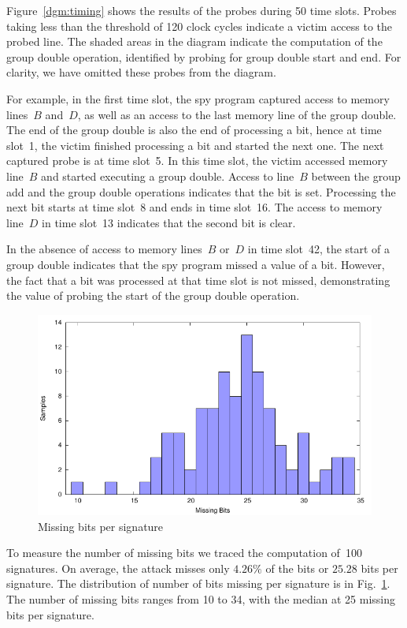 \documentclass[twocolumn]{svjour3}
\begin{document}
Figure~\ref{dgm:timing} shows the results of the probes during 50 time slots.
Probes taking less than the threshold of 120 clock cycles indicate a victim access to the probed line.
The shaded areas in the diagram indicate the computation of the group double operation, identified
by probing for group double start and end.
For clarity, we have omitted these probes from the diagram.


For example, in the first time slot, the spy program captured access to memory lines~$B$ and~$D$, as well as an access
to the last memory line of the group double.
The end of the group double is also the end of processing a bit, hence at time slot~1, the victim finished processing a bit
and started the next one.
The next captured probe is at time slot~5.
In this time slot, the victim accessed memory line~$B$ and started executing a group double.  
Access to line~$B$ between the group add and the group double operations indicates that the bit is set.
Processing the next bit starts at time slot~8 and ends in time slot~16.
The access to memory line~$D$ in time slot~13 indicates that the second bit is clear.

In the absence of access to memory lines~$B$ or~$D$ in time slot~42, the start of a group double indicates
that the spy program missed a value of a bit.
However, the fact that a bit was processed at that time slot is not missed,
demonstrating the value of probing the start of the group double operation.

\begin{figure}[htb]
\includegraphics[width=\columnwidth]{images/missing}
\caption{Missing bits per signature\label{dgm:dist}}
\end{figure}

To measure the number of missing bits we traced the computation of~100 signatures.
On average, the attack misses only $4.26\%$ of the bits or $25.28$ bits per signature.
The distribution of number of bits missing per signature is in Fig.~\ref{dgm:dist}.
The number of missing bits ranges from 10 to 34, with the median at 25 missing bits per signature.
\end{document}
